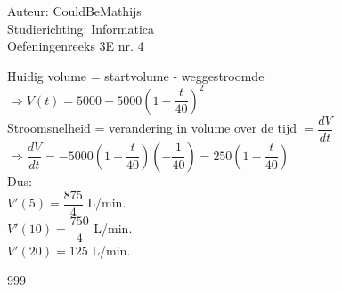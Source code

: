 \documentclass[a4paper]{article}
\begin{document}
  
\noindent \large Auteur: CouldBeMathijs \\
\noindent \large Studierichting: Informatica\\
\noindent \large Oefeningenreeks 3E nr. 4\\

\medskip

\normalsize

Huidig volume = startvolume - weggestroomde\\

$\Rightarrow V(t) = 5000 - 5000\left(1 - \dfrac{t}{40}\right)^2$\\

Stroomsnelheid = verandering in volume over de tijd $= \dfrac{dV}{dt}$\\

$\Rightarrow \dfrac{dV}{dt} = -5000\left(1 - \dfrac{t}{40}\right)\left(- \dfrac{1}{40}\right) =  250\left(1- \dfrac{t}{40}\right)$\\

Dus:\\

$V'(5) = \dfrac{875}{4}$ L/min.\\

$V'(10) = \dfrac{750}{4}$ L/min.\\

$V'(20) = 125$ L/min.\\



\begin{thebibliography}{999}
\end{thebibliography}
\end{document}
